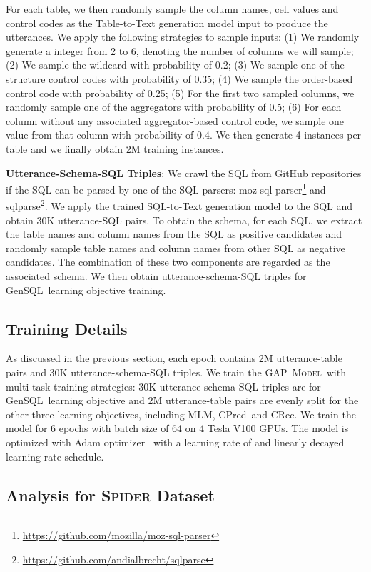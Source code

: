 \documentclass[letterpaper]{article} \usepackage{aaai21}  \usepackage{times}  \usepackage{helvet} \usepackage{courier}  \usepackage[hyphens]{url}  \usepackage{graphicx} \usepackage{booktabs}
\newcommand{\modelnamelm}{\textsc{GAP~Model}}
\newcommand{\colpred}{CPred}
\newcommand{\colrec}{CRec}
\newcommand{\gensql}{GenSQL}
\begin{document}
For each table, we then randomly sample the column names, cell values and control codes as the Table-to-Text generation model input to produce the utterances.
We apply the following strategies to sample inputs:
(1) We randomly generate a integer from 2 to 6, denoting the number of columns we will sample;
(2) We sample the wildcard  with probability of 0.2;
(3) We sample one of the structure control codes with probability of 0.35;
(4) We sample the order-based control code with probability of 0.25;
(5) For the first two sampled columns, we randomly sample one of the aggregators with probability of 0.5;
(6) For each column without any associated aggregator-based control code, we sample one value from that column with probability of 0.4.
We then generate 4 instances per table and we finally obtain 2M training instances.

\smallskip \noindent \textbf{Utterance-Schema-SQL Triples}:
We crawl the SQL from GitHub repositories if the SQL can be parsed by one of the SQL parsers: moz-sql-parser\footnote{\url{https://github.com/mozilla/moz-sql-parser}} and sqlparse\footnote{\url{https://github.com/andialbrecht/sqlparse}}.
We apply the trained SQL-to-Text generation model to the SQL and obtain 30K utterance-SQL pairs.
To obtain the schema, for each SQL, we extract the table names and column names from the SQL as positive candidates and randomly sample table names and column names from other SQL as negative candidates.
The combination of these two components are regarded as the associated schema.
We then obtain utterance-schema-SQL triples for \gensql~learning objective training.

\subsection{Training Details}

As discussed in the previous section, each epoch contains 2M utterance-table pairs and 30K utterance-schema-SQL triples.
We train the \modelnamelm~with multi-task training strategies:
30K utterance-schema-SQL triples are for \gensql~learning objective and 2M utterance-table pairs are evenly split for the other three learning objectives, including MLM, \colpred~and \colrec.
We train the model for 6 epochs with batch size of 64 on 4 Tesla V100 GPUs.
The model is optimized with Adam optimizer~\cite{kingma2014adam} with a learning rate of  and linearly decayed learning rate schedule.


\subsection{Analysis for \textsc{Spider} Dataset}
\end{document}
